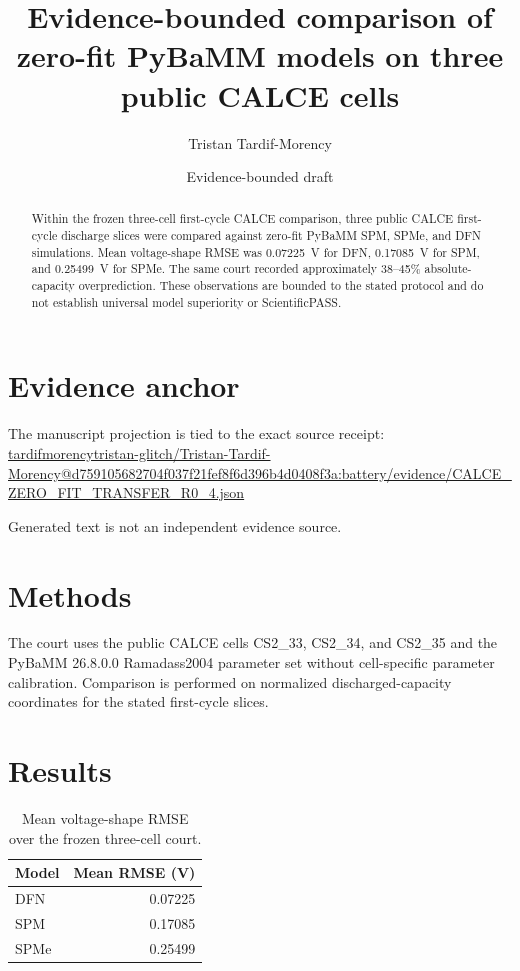 \documentclass[11pt]{article}
\title{Evidence-bounded comparison of zero-fit PyBaMM models on three public CALCE cells}
\author{Tristan Tardif-Morency}
\date{Evidence-bounded draft}
\begin{document}
\maketitle

\begin{abstract}
Within the frozen three-cell first-cycle CALCE comparison, three public CALCE first-cycle discharge slices were compared against zero-fit PyBaMM SPM, SPMe, and DFN simulations. Mean voltage-shape RMSE was 0.07225~V for DFN, 0.17085~V for SPM, and 0.25499~V for SPMe. The same court recorded approximately 38--45\% absolute-capacity overprediction. These observations are bounded to the stated protocol and do not establish universal model superiority or ScientificPASS.
\end{abstract}

\section{Evidence anchor}
The manuscript projection is tied to the exact source receipt:\\
\url{tardifmorencytristan-glitch/Tristan-Tardif-Morency@d759105682704f037f21fef8f6d396b4d0408f3a:battery/evidence/CALCE_ZERO_FIT_TRANSFER_R0_4.json}

Generated text is not an independent evidence source.

\section{Methods}
The court uses the public CALCE cells CS2\_33, CS2\_34, and CS2\_35 and the PyBaMM 26.8.0.0 Ramadass2004 parameter set without cell-specific parameter calibration. Comparison is performed on normalized discharged-capacity coordinates for the stated first-cycle slices.

\section{Results}
\begin{table}[ht]
\centering
\caption{Mean voltage-shape RMSE over the frozen three-cell court.}
\begin{tabular}{lr}
\toprule
Model & Mean RMSE (V) \\
\midrule
DFN & 0.07225 \\
SPM & 0.17085 \\
SPMe & 0.25499 \\
\bottomrule
\end{tabular}
\end{table}
\end{document}
